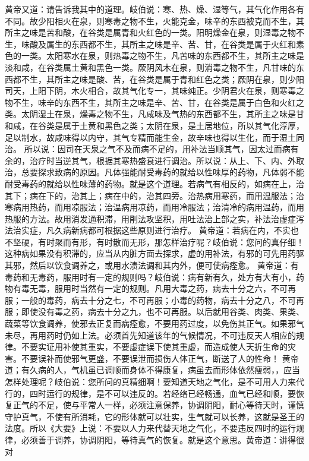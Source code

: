 \documentclass[a4paper,12pt,UTF8,twoside]{ctexbook}
\begin{document}
黄帝又道：请告诉我其中的道理。岐伯说：寒、热、燥、湿等气，其气化作用各有不同。故少阳相火在泉，则寒毒之物不生，火能克金，味辛的东西被克而不生，其所主之味是苦和酸，在谷类是属青和火红色的一类。阳明燥金在泉，则湿毒之物不生，味酸及属生的东西都不生，其所主之味是辛、苦、甘，在谷类是属于火红和素色的一类。太阳寒水在泉，则热毒之物不生，凡苦味的东西都不生，其所主之味是淡和咸，在谷类属土黄和黑色一类。厥阴风木在泉，则消毒之物不生，凡甘味的东西都不生，其所主之味是酸、苦，在谷类是属于青和红色之类；厥阴在泉，则少阳司天，上阳下阴，木火相合，故其气化专一，其味纯正。少阴君火在泉，则寒毒之物不生，味辛的东西不生，其所主之味是辛、苦、甘，在谷类是属于白色和火红之类。太阴湿土在泉，燥毒之物不生，凡咸味及气热的东西都不生，其所主之味是甘和咸，在谷类是属于土黄和黑色之类；太阴在泉，是土居地位，所以其气化淳厚，足以制水，故咸味得以内守，其气专精而能生金，故辛味也得以生化，而于湿土同治。
所以说：因司在天泉之气不及而病不足的，用补法当顺其气，因太过而病有余的，治疗时当逆其气，根据其寒热盛衰进行调治。所以说：从上、下、内、外取治，总要探求致病的原因。凡体强能耐受毒药的就给以性味厚的药物，凡体弱不能耐受毒药的就给以性味薄的药物。就是这个道理。若病气有相反的，如病在上，治其下；病在下的，治其上；病在中的，治其四旁。治热病用寒药，而用温服法；治寒病用热药，而用凉服法；治温病用凉药，而用冷服法；治清冷的病用温药，而用热服的方法。故用消发通积滞，用削法攻坚积，用吐法治上部之实，补法治虚症泻法治实症，凡久病新病都可根据这些原则进行治疗。
黄帝道：若病在内，不实也不坚硬，有时聚而有形，有时散而无形，那怎样治疗呢？岐伯说：您问的真仔细！这种病如果没有积滞的，应当从内脏方面去探求，虚的用补法，有邪的可先用药驱其邪，然后以饮食调养之，或用水渍法调和其内外，便可使病痊愈。
黄帝道：有毒药和无毒药，服用时有一定的规则吗？岐伯说：病有新有久，处方有大有小，药物有毒无毒，服用时当然有一定的规则。凡用大毒之药，病去十分之六，不可再服；一般的毒药，病去十分之七，不可再服；小毒的药物，病去十分之八，不可再服；即使没有毒之药，病去十分之九，也不可再服。以后就用谷类、肉类、果类、蔬菜等饮食调养，使邪去正复而病痊愈，不要用药过度，以免伤其正气。如果邪气未尽，再用药时仍如上法。必须首先知道该年的气候情况，不可违反天人相应的规律。不要实证用补使其重实，不要虚症误下使其重虚，而造成使人天折生命的灾害。不要误补而使邪气更盛，不要误泄而损伤人体正气，断送了人的性命！
黄帝道；有久病的人，气机虽已调顺而身体不得康复，病虽去而形体依然瘦弱，，应当怎样处理呢？岐伯说：您所问的真精细啊！要知道天地之气化，是不可用人力来代行的，四时运行的规律，是不可以违反的。若经络已经畅通，血气已经和顺，要恢复正气的不足，使与平常人一样，必须注意保养，协调阴阳，耐心等待天时，谨慎守护真气，不使有所消耗，它的形体就可以壮实，生气就可以长养，这就是圣王的法度。所以《大要》上说：不要以人力来代替天地之气化，不要违反四时的运行规律，必须善于调养，协调阴阳，等待真气的恢复。就是这个意思。黄帝道：讲得很对
\end{document}
